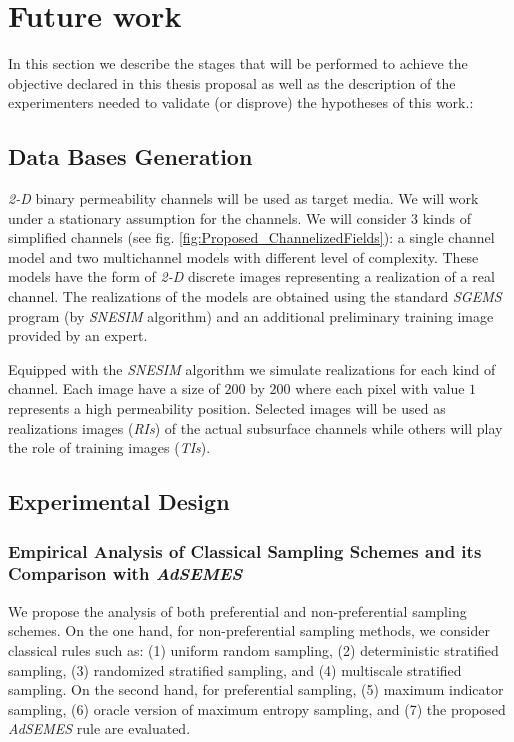 \chapter{Future work}

In this section we describe the stages that will be performed to achieve the objective declared in this thesis proposal as well as the description of the experimenters needed to validate (or disprove) the hypotheses of this work.:

\section{Data Bases Generation}
\label{sec_DB_Gen}

\emph{2-D} binary permeability channels will be used as target media. We will work under a stationary assumption for the channels. We will consider $3$ kinds of simplified channels (see fig. \ref{fig:Proposed_ChannelizedFields}): a single channel model and two multichannel models with different level of complexity. These models have the form of \emph{2-D} discrete images representing a realization of a real channel. The realizations of the models are obtained using the standard \emph{SGEMS} program (by \emph{SNESIM} algorithm) and an additional preliminary training image provided by an expert.
 	
Equipped with the \emph{SNESIM} algorithm we simulate realizations for each kind of channel. Each image have a size of $200$ by $200$ where each pixel with value $1$ represents a high permeability position. Selected images will be used as realizations images (\emph{RIs}) of the actual subsurface channels while others will play the role of training images (\emph{TIs}).
	
\section{Experimental Design}
\label{sec_Prop_Exp}

\subsection{Empirical Analysis of Classical Sampling Schemes and its Comparison with \emph{AdSEMES} }

We propose the analysis of both preferential and non-preferential sampling schemes. On the one hand, for non-preferential sampling methods, we consider classical rules such as: (1) uniform random sampling, (2) deterministic stratified sampling, (3) randomized stratified sampling, and (4) multiscale stratified sampling. On the second hand, for preferential sampling, (5) maximum indicator sampling, (6) oracle version of maximum entropy sampling, and (7) the proposed \emph{AdSEMES} rule are evaluated.

